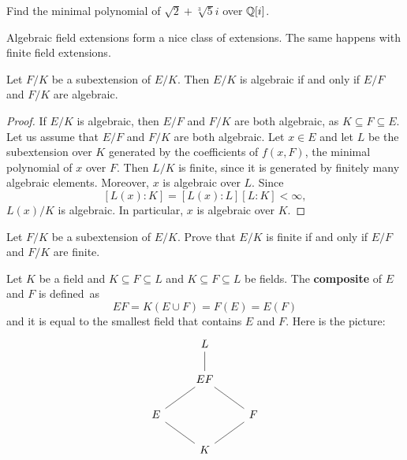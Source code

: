 \begin{exercise}
    Find the minimal polynomial of $\sqrt{2}+\sqrt[3]{5}i$ over $\mathbb{Q}[i]$.
\end{exercise}

%
%
%
Algebraic field extensions form a nice class of extensions. The same happens
with finite field extensions. 

\begin{proposition}
	Let $F/K$ be a subextension of $E/K$. Then $E/K$ is algebraic 
	if and only if $E/F$ and $F/K$ are algebraic. 
\end{proposition}

\begin{proof}
    If $E/K$ is algebraic, then $E/F$ and $F/K$ are both algebraic, 
    as $K\subseteq F\subseteq E$. 
    Let us assume that $E/F$ and $F/K$ are both algebraic. Let $x\in E$ and 
    let $L$ be the subextension over $K$ generated by the coefficients of $f(x,F)$, 
    the minimal polynomial of $x$ over $F$. Then $L/K$ is finite, since it is generated
    by finitely many algebraic elements. Moreover, $x$ is algebraic over $L$. Since 
    \[
    [L(x):K]=[L(x):L][L:K]<\infty,
    \]
    $L(x)/K$ is algebraic. In particular, $x$ is algebraic over $K$. 
\end{proof}

\begin{exercise}
	Let $F/K$ be a subextension of $E/K$. Prove that $E/K$ is finite 
	if and only if $E/F$ and $F/K$ are finite. 
\end{exercise}

Let $K$ be a field and $K\subseteq 
F\subseteq L$ and $K\subseteq F\subseteq L$ be fields. The \textbf{composite}  
of $E$ and $F$ is defined~as 
\[
EF=K(E\cup F)=F(E)=E(F)
\]
and it is equal to the 
smallest field that contains $E$ and $F$. Here is the
picture:
\[\begin{tikzcd}
	& L \\
	& EF \\
	E && F \\
	& K
	\arrow[no head, from=1-2, to=2-2]
	\arrow[no head, from=2-2, to=3-1]
	\arrow[no head, from=2-2, to=3-3]
	\arrow[no head, from=3-1, to=4-2]
	\arrow[no head, from=4-2, to=3-3]
\end{tikzcd}\]


